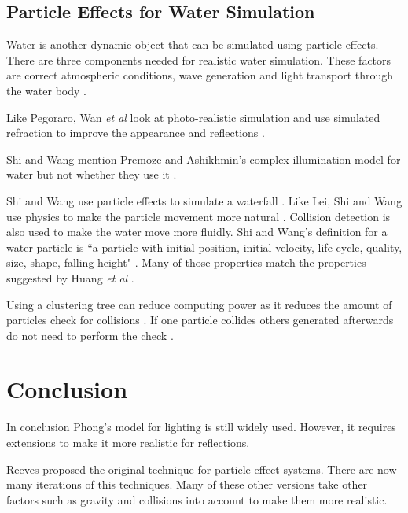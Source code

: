 \documentclass{scrartcl}
\begin{document}
\subsection{Particle Effects for Water Simulation}
Water is another dynamic object that can be simulated using particle effects. There are three components needed for realistic water simulation. These factors are correct atmospheric conditions, wave generation and light transport through the water body \cite{Premoze}.

Like Pegoraro, Wan \textit{et al} look at photo-realistic simulation and use simulated refraction to improve the appearance and reflections \cite{Pegoraro, Wan}.

Shi and Wang mention Premoze and Ashikhmin's complex illumination model for water but not whether they use it \cite{Premoze}.

Shi and Wang use particle effects to simulate a waterfall \cite{Shi}. Like Lei, Shi and Wang use physics to make the particle movement more natural \cite{Lei, Shi}. Collision detection is also used to make the water move more fluidly.  Shi and Wang's definition for a water particle is ``a particle with initial position, initial velocity, life cycle, quality, size, shape, falling height"  \cite[p.1]{Shi}.  Many of those properties match the properties suggested by Huang \textit{et al} \cite{Huang }.


Using a clustering tree can reduce computing power as it reduces the amount of particles check for collisions \cite{Shi}. If one particle collides others generated afterwards do not need to perform the check \cite{Shi}.


\section{Conclusion}
In conclusion Phong's model for lighting is still widely used. However, it requires extensions to make it more realistic for reflections.


Reeves proposed the original technique for particle effect systems. There are now many iterations of this techniques. Many of these other versions take other factors such as gravity and collisions into account to make them more realistic. 

	


	
\end{document}
